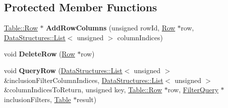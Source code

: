 \subsection*{Protected Member Functions}
\begin{DoxyCompactItemize}
\item 
\hypertarget{class_data_structures_1_1_table_a5c4c1196b42086be6408e60dad6fde76}{\hyperlink{struct_data_structures_1_1_table_1_1_row}{Table\-::\-Row} $\ast$ {\bfseries Add\-Row\-Columns} (unsigned row\-Id, \hyperlink{struct_data_structures_1_1_table_1_1_row}{Row} $\ast$row, \hyperlink{class_data_structures_1_1_list}{Data\-Structures\-::\-List}$<$ unsigned $>$ column\-Indices)}\label{class_data_structures_1_1_table_a5c4c1196b42086be6408e60dad6fde76}

\item 
\hypertarget{class_data_structures_1_1_table_a244bab35a9e5e602a50dfd2d9c5e5287}{void {\bfseries Delete\-Row} (\hyperlink{struct_data_structures_1_1_table_1_1_row}{Row} $\ast$row)}\label{class_data_structures_1_1_table_a244bab35a9e5e602a50dfd2d9c5e5287}

\item 
\hypertarget{class_data_structures_1_1_table_a7d6884ebe4edd4eddbbf3e118abd2b33}{void {\bfseries Query\-Row} (\hyperlink{class_data_structures_1_1_list}{Data\-Structures\-::\-List}$<$ unsigned $>$ \&inclusion\-Filter\-Column\-Indices, \hyperlink{class_data_structures_1_1_list}{Data\-Structures\-::\-List}$<$ unsigned $>$ \&column\-Indices\-To\-Return, unsigned key, \hyperlink{struct_data_structures_1_1_table_1_1_row}{Table\-::\-Row} $\ast$row, \hyperlink{struct_data_structures_1_1_table_1_1_filter_query}{Filter\-Query} $\ast$inclusion\-Filters, \hyperlink{class_data_structures_1_1_table}{Table} $\ast$result)}\label{class_data_structures_1_1_table_a7d6884ebe4edd4eddbbf3e118abd2b33}

\end{DoxyCompactItemize}
